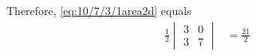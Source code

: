 \documentclass[12pt]{article}
\newcommand{\mydet}[1]{\ensuremath{\begin{vmatrix}#1\end{vmatrix}}}
\begin{document}
\begin{enumerate}
\begin{enumerate}
		Therefore, \eqref{eq:10/7/3/1area2d} equals \\
		\fi
\begin{align}
	\frac{1}{2}\mydet{3 & 0\\3 & 7}  
	&=	\frac{21}{2}
\end{align}

\end{enumerate}
\end{enumerate}
\end{document}
